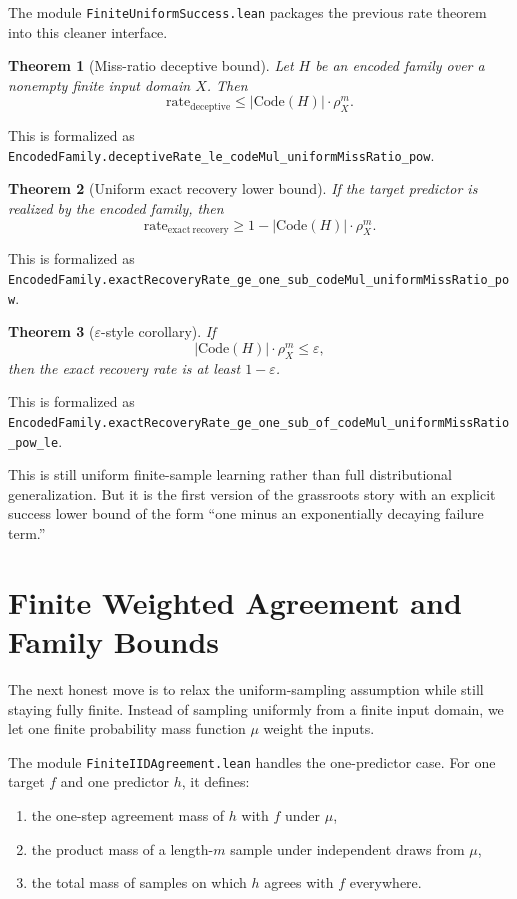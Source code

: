 \documentclass[11pt]{article}
\newtheorem{theorem}{Theorem}[section]
\theoremstyle{remark}
\begin{document}
The module \texttt{FiniteUniformSuccess.lean} packages the previous rate theorem
into this cleaner interface.

\begin{theorem}[Miss-ratio deceptive bound]
Let \(H\) be an encoded family over a nonempty finite input domain \(X\).  Then
\[
  \mathrm{rate}_{\mathrm{deceptive}}
  \le
  |\mathrm{Code}(H)| \cdot \rho_X^m.
\]
\end{theorem}

\noindent
This is formalized as
\texttt{EncodedFamily.deceptiveRate\_le\_codeMul\_uniformMissRatio\_pow}.

\begin{theorem}[Uniform exact recovery lower bound]
If the target predictor is realized by the encoded family, then
\[
  \mathrm{rate}_{\mathrm{exact\ recovery}}
  \ge
  1 - |\mathrm{Code}(H)| \cdot \rho_X^m.
\]
\end{theorem}

\noindent
This is formalized as
\texttt{EncodedFamily.exactRecoveryRate\_ge\_one\_sub\_codeMul\_uniformMissRatio\_pow}.

\begin{theorem}[\(\varepsilon\)-style corollary]
If
\[
  |\mathrm{Code}(H)| \cdot \rho_X^m \le \varepsilon,
\]
then the exact recovery rate is at least \(1 - \varepsilon\).
\end{theorem}

\noindent
This is formalized as
\texttt{EncodedFamily.exactRecoveryRate\_ge\_one\_sub\_of\_codeMul\_uniformMissRatio\_pow\_le}.

This is still uniform finite-sample learning rather than full distributional
generalization.  But it is the first version of the grassroots story with an
explicit success lower bound of the form ``one minus an exponentially decaying
failure term.''

\section{Finite Weighted Agreement and Family Bounds}

The next honest move is to relax the uniform-sampling assumption while still
staying fully finite.  Instead of sampling uniformly from a finite input domain,
we let one finite probability mass function \(\mu\) weight the inputs.

The module \texttt{FiniteIIDAgreement.lean} handles the one-predictor case.  For
one target \(f\) and one predictor \(h\), it defines:
\begin{enumerate}[leftmargin=1.5em]
  \item the one-step agreement mass of \(h\) with \(f\) under \(\mu\),
  \item the product mass of a length-\(m\) sample under independent draws from \(\mu\),
  \item the total mass of samples on which \(h\) agrees with \(f\) everywhere.
\end{enumerate}
\end{document}
